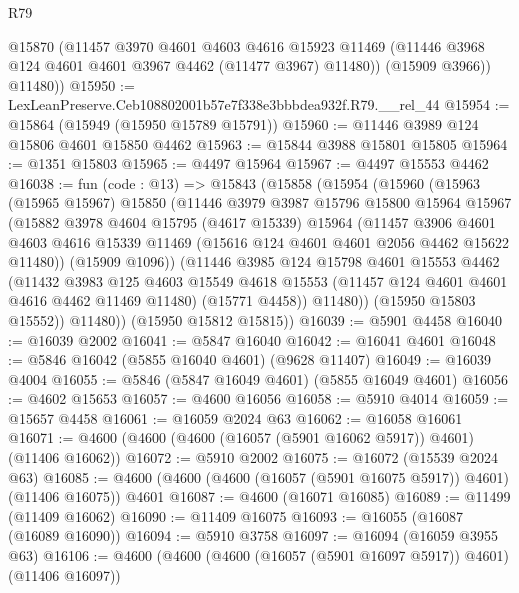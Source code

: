 \begin{lexlean}{R79}
\begin{coremodule}
          @15870
          (@11457
            @3970
            @4601
            @4603
            @4616
            @15923
            @11469
            (@11446 @3968 @124 @4601 @4601 @3967 @4462 (@11477 @3967) @11480))
          (@15909 @3966))
        @11480))
@15950 := LexLeanPreserve.Ceb108802001b57e7f338e3bbbdea932f.R79.__rel_44
@15954 := @15864 (@15949 (@15950 @15789 @15791))
@15960 := @11446 @3989 @124 @15806 @4601 @15850 @4462
@15963 := @15844 @3988 @15801 @15805
@15964 := @1351 @15803
@15965 := @4497 @15964
@15967 := @4497 @15553 @4462
@16038 := fun (code : @13) =>
  @15843
    (@15858
      (@15954
        (@15960
          (@15963
            (@15965 @15967)
            @15850
            (@11446
              @3979
              @3987
              @15796
              @15800
              @15964
              @15967
              (@15882
                @3978
                @4604
                @15795
                (@4617 @15339)
                @15964
                (@11457
                  @3906
                  @4601
                  @4603
                  @4616
                  @15339
                  @11469
                  (@15616 @124 @4601 @4601 @2056 @4462 @15622 @11480))
                (@15909 @1096))
              (@11446
                @3985
                @124
                @15798
                @4601
                @15553
                @4462
                (@11432
                  @3983
                  @125
                  @4603
                  @15549
                  @4618
                  @15553
                  (@11457 @124 @4601 @4601 @4616 @4462 @11469 @11480)
                  (@15771 @4458))
                @11480))
            (@15950 @15803 @15552))
          @11480))
      (@15950 @15812 @15815))
@16039 := @5901 @4458
@16040 := @16039 @2002
@16041 := @5847 @16040
@16042 := @16041 @4601
@16048 := @5846 @16042 (@5855 @16040 @4601) (@9628 @11407)
@16049 := @16039 @4004
@16055 := @5846 (@5847 @16049 @4601) (@5855 @16049 @4601)
@16056 := @4602 @15653
@16057 := @4600 @16056
@16058 := @5910 @4014
@16059 := @15657 @4458
@16061 := @16059 @2024 @63
@16062 := @16058 @16061
@16071 := @4600 (@4600 (@4600 (@16057 (@5901 @16062 @5917)) @4601) (@11406 @16062))
@16072 := @5910 @2002
@16075 := @16072 (@15539 @2024 @63)
@16085 := @4600 (@4600 (@4600 (@16057 (@5901 @16075 @5917)) @4601) (@11406 @16075)) @4601
@16087 := @4600 (@16071 @16085)
@16089 := @11499 (@11409 @16062)
@16090 := @11409 @16075
@16093 := @16055 (@16087 (@16089 @16090))
@16094 := @5910 @3758
@16097 := @16094 (@16059 @3955 @63)
@16106 := @4600 (@4600 (@4600 (@16057 (@5901 @16097 @5917)) @4601) (@11406 @16097))

\end{coremodule}
\end{lexlean}
